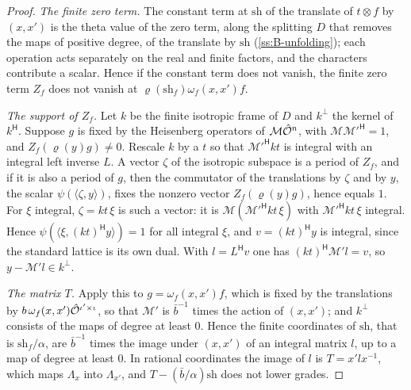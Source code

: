 \begin{proof}
\emph{The finite zero term.} The constant term at $\mathrm{sh}$ of the translate of $t\otimes f$ by $(x,x')$ is the theta value of the zero term, along the splitting $D$ that removes the maps of positive degree, of the translate by $\mathrm{sh}$ (\cref{ss:B-unfolding}); each operation acts separately on the real and finite factors, and the characters contribute
a scalar. Hence if the constant term does not vanish, the finite zero term $Z_f$ does not vanish at $\varrho(\mathrm{sh}_f)\omega_f(x,x')f$.

\emph{The support of $Z_f$.} Let $k$ be the finite isotropic frame of $D$ and $k^\perp$ the kernel of $k^{\mathsf H}$. Suppose $g$ is fixed by the Heisenberg operators of $\mathcal M\hat{\mathcal{O}}^n$, with $\mathcal M\mathcal M'^{\mathsf H}=1$, and $Z_f(\varrho(y)g)\ne0$. Rescale $k$ by a $t$ so that $\mathcal M'^{\mathsf H}kt$ is integral with an integral left inverse $L$. A
vector $\zeta$ of the isotropic subspace is a period of $Z_f$, and if it is also a period of $g$, then the commutator of the translations by $\zeta$ and by $y$, the scalar $\psi(\langle\zeta,y\rangle)$, fixes the nonzero vector $Z_f(\varrho(y)g)$, hence equals $1$. For $\xi$ integral, $\zeta=kt\,\xi$ is such a vector: it is
$\mathcal M(\mathcal M'^{\mathsf H}kt\,\xi)$ with $\mathcal M'^{\mathsf H}kt\,\xi$ integral. Hence $\psi(\langle\xi,(kt)^{\mathsf H}y\rangle)=1$ for all integral $\xi$, and $v=(kt)^{\mathsf H}y$ is integral, since the standard lattice is its own dual. With $l=L^{\mathsf H}v$ one has $(kt)^{\mathsf H}\mathcal M'l=v$, so $y-\mathcal M'l\in k^\perp$.

\emph{The matrix $T$.} Apply this to $g=\omega_f(x,x')f$, which is fixed by the translations by $b\,\omega_f(x,x')\hat{\mathcal{O}}^{\iota'\times\iota}$, so that $\mathcal M'$ is $\bar b^{-1}$ times the action of $(x,x')$; and $k^\perp$ consists of the maps of degree at least $0$. Hence the finite coordinates of $\mathrm{sh}$, that is $\mathrm{sh}_f/\alpha$, are
$\bar b^{-1}$ times the image under $(x,x')$ of an integral matrix $l$, up to a map of degree at least $0$. In rational coordinates the image of $l$ is $T=x'lx^{-1}$, which maps $\Lambda_x$ into $\Lambda_{x'}$, and $T-(\bar b/\alpha)\mathrm{sh}$ does not lower grades.


\end{proof}
